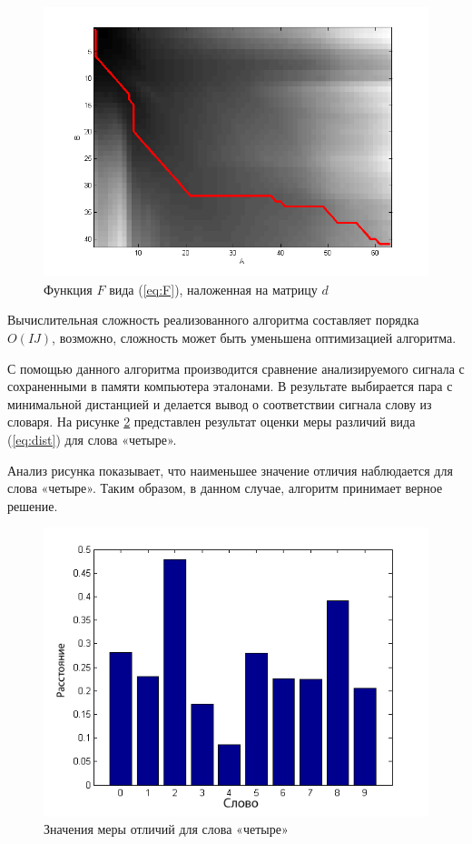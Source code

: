 \documentclass[a4paper,14pt,russian,utf8,nocolumnsxix,nocolumnxxxi,nocolumnxxxii]{eskdtext}
\begin{document}
\begin{figure}[h]	
	\centering
	\includegraphics[width=120mm]{d_matrix.png}			
	\caption{Функция $F$ вида (\ref{eq:F}), наложенная на матрицу $d$}
	\label{d_matrix}
\end{figure}

Вычислительная сложность реализованного алгоритма составляет порядка $O(IJ)$, возможно, сложность может быть уменьшена оптимизацией алгоритма.

С помощью данного алгоритма производится сравнение анализируемого сигнала с сохраненными в памяти компьютера эталонами. В результате выбирается пара с минимальной дистанцией и делается вывод о соответствии сигнала слову из словаря. На рисунке \ref{dist_4} представлен результат оценки меры различий вида (\ref{eq:dist}) для слова «четыре».

Анализ рисунка показывает, что наименьшее значение отличия наблюдается для слова «четыре». Таким образом, в данном случае, алгоритм принимает верное решение.

\begin{figure}[H]	
	\centering
	\includegraphics[width=120mm]{dist_4.png}
	\caption{Значения меры отличий для слова «четыре»}
	\label{dist_4}
\end{figure} 
\end{document}
